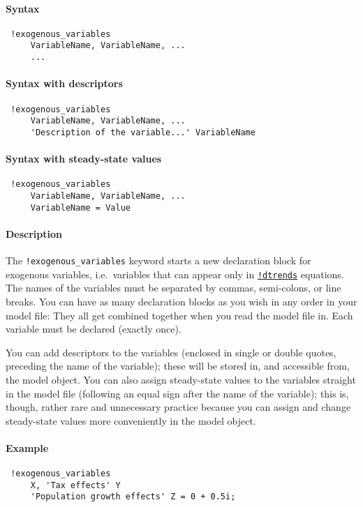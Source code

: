 


	\paragraph{Syntax}
 
 \begin{verbatim}
 !exogenous_variables
     VariableName, VariableName, ...
     ...
 \end{verbatim}
 
 \paragraph{Syntax with descriptors}
 
 \begin{verbatim}
 !exogenous_variables
     VariableName, VariableName, ...
     'Description of the variable...' VariableName
 \end{verbatim}
 
 \paragraph{Syntax with steady-state values}
 
 \begin{verbatim}
 !exogenous_variables
     VariableName, VariableName, ...
     VariableName = Value
 \end{verbatim}
 
 \paragraph{Description}
 
 The \texttt{!exogenous\_variables} keyword starts a new declaration
 block for exogenous variables, i.e.~variables that can appear only in
 \href{modellang/dtrends}{\texttt{!dtrends}} equations. The names of the
 variables must be separated by commas, semi-colons, or line breaks. You
 can have as many declaration blocks as you wish in any order in your
 model file: They all get combined together when you read the model file
 in. Each variable must be declared (exactly once).
 
 You can add descriptors to the variables (enclosed in single or double
 quotes, preceding the name of the variable); these will be stored in,
 and accessible from, the model object. You can also assign steady-state
 values to the variables straight in the model file (following an equal
 sign after the name of the variable); this is, though, rather rare and
 unnecessary practice because you can assign and change steady-state
 values more conveniently in the model object.
 
 \paragraph{Example}
 
 \begin{verbatim}
 !exogenous_variables
     X, 'Tax effects' Y
     'Population growth effects' Z = 0 + 0.5i;
 \end{verbatim}


